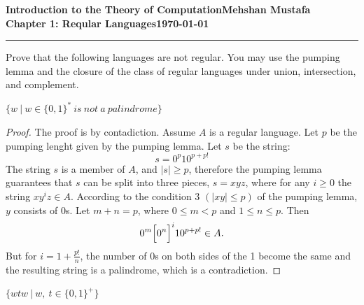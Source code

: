 \documentclass[11pt]{article}
\newcommand{\myname}{Mehshan Mustafa}
\newcommand{\dated}{\today}
\newenvironment{problem}[2][Problem]{\begin{trivlist}
\item[\hskip \labelsep {\bfseries #1}\hskip \labelsep {\bfseries #2.}]}{\end{trivlist}}
\begin{document}
\textbf{Introduction to the Theory of
Computation}\hfill\textbf{\myname}\\[0.01in]
\textbf{Chapter 1: Reqular Languages}\hfill\textbf{\dated}\\
\smallskip\hrule\bigskip

\begin{problem}{1.46}
Prove that the following languages are not regular. You may use the pumping
lemma and the closure of the class of regular languages under union, intersection, and complement.
\end{problem}

\begin{problem}[Part]{c}
$\{w \ | \ w \in \{0,1\}^{*} \ is \ not \ a \ palindrome\}$
\end{problem}

\begin{proof}
The proof is by contadiction. Assume $A$ is a regular language. Let $p$ be the pumping lenght given by the pumping lemma. Let $s$ be the string:
\[ s = 0^{p}10^{p+p!} \]
The string $s$ is a member of $A$, and $|s| \geq p$, therefore the pumping lemma guarantees that $s$ can be split into three pieces, $s = xyz$, where for any $i \geq 0$ the string $xy^{i}z \in A$. According to the condition 3 $(|xy| \leq p)$ of the pumping lemma, $y$ consists of 0s. Let $m+n = p$, where $0 \leq m < p$ and $1 \leq n \leq p$. Then
\[ 0^{m} \Bigl[0^{n}\Bigr]^{i}10^{p+p!} \in A. \]
But for $i = 1 + \frac{p!}{n}$, the number of 0s on both sides of the 1 become the same and the resulting string is a palindrome, which is a contradiction.
\end{proof}

\begin{problem}[Part]{d}
$\{wtw \ | \ w, \ t \in \{0,1\}^{+}\}$
\end{problem}
\end{document}
